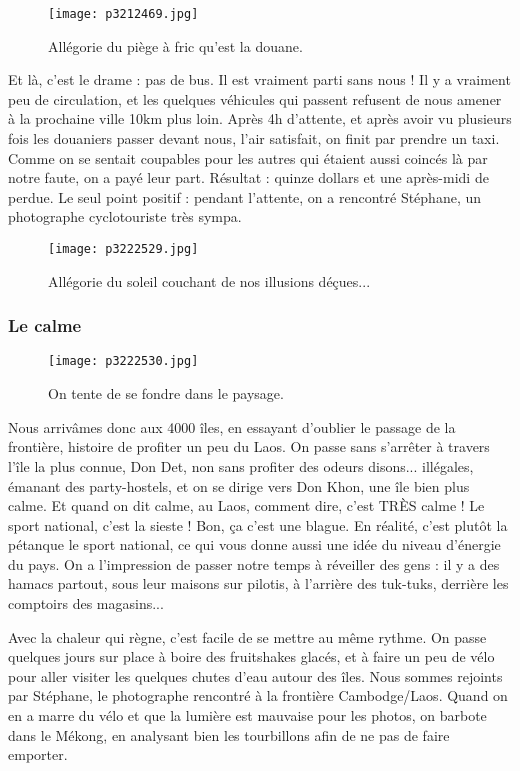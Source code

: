 \documentclass{book}
\begin{document}
\begin{figure}[h]
\centering
\texttt{[image: p3212469.jpg]}
\caption*{Allégorie du piège à fric qu'est la douane.}
\end{figure}

Et là, c'est le drame : pas de bus. Il est vraiment parti sans nous ! Il y a vraiment peu de circulation, et les quelques véhicules qui passent refusent de nous amener à la prochaine ville 10km plus loin. Après 4h d'attente, et après avoir vu plusieurs fois les douaniers passer devant nous, l'air satisfait, on finit par prendre un taxi. Comme on se sentait coupables pour les autres qui étaient aussi coincés là par notre faute, on a payé leur part. Résultat : quinze dollars et une après-midi de perdue. Le seul point positif : pendant l'attente, on a rencontré Stéphane, un photographe cyclotouriste très sympa.


\begin{figure}[H]
\centering
\texttt{[image: p3222529.jpg]}
\caption*{Allégorie du soleil couchant de nos illusions déçues...}
\end{figure}


\subsubsection{Le calme}


\begin{wrapfigure}{l}{0.55\textwidth}
\centering
\texttt{[image: p3222530.jpg]}
\caption*{On tente de se fondre dans le paysage.}
\end{wrapfigure}


Nous arrivâmes donc aux 4000 îles, en essayant d'oublier le passage de la frontière, histoire de profiter un peu du Laos. On passe sans s'arrêter à travers l'île la plus connue, Don Det, non sans profiter des odeurs disons... illégales, émanant des party-hostels, et on se dirige vers Don Khon, une île bien plus calme. Et quand on dit calme, au Laos, comment dire, c'est TRÈS calme ! Le sport national, c'est la sieste ! Bon, ça c'est une blague. En réalité, c'est plutôt la pétanque le sport national, ce qui vous donne aussi une idée du niveau d'énergie du pays. On a l'impression de passer notre temps à réveiller des gens : il y a des hamacs partout, sous leur maisons sur pilotis, à l'arrière des tuk-tuks, derrière les comptoirs des magasins...


Avec la chaleur qui règne, c'est facile de se mettre au même rythme. On passe quelques jours sur place à boire des fruitshakes glacés, et à faire un peu de vélo pour aller visiter les quelques chutes d'eau autour des îles. Nous sommes rejoints par Stéphane, le photographe rencontré à la frontière Cambodge/Laos. Quand on en a marre du vélo et que la lumière est mauvaise pour les photos, on barbote dans le Mékong, en analysant bien les tourbillons afin de ne pas de faire emporter.
\end{document}
